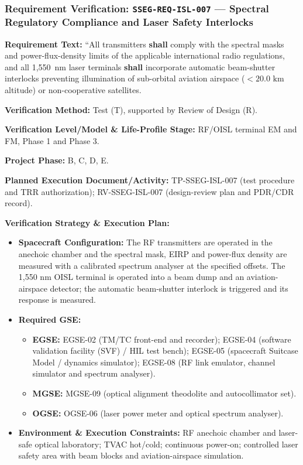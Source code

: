 \subsubsection{Requirement Verification: \texttt{SSEG-REQ-ISL-007} --- Spectral Regulatory Compliance and Laser Safety Interlocks}
\label{ver:SSEG-REQ-ISL-007}
\textbf{Requirement Text:} ``All  transmitters \textbf{shall} comply with the spectral masks and power-flux-density limits of the applicable international radio regulations, and all 1,550~nm laser  terminals \textbf{shall} incorporate automatic beam-shutter interlocks preventing illumination of sub-orbital aviation airspace ($< 20.0\text{ km}$ altitude) or non-cooperative satellites.
\par\textbf{Verification Method:} Test (T), supported by Review of Design (R).
\par\textbf{Verification Level/Model \& Life-Profile Stage:} RF/OISL terminal EM and FM, Phase 1 and Phase 3.
\par\textbf{Project Phase:} B, C, D, E.
\par\textbf{Planned Execution Document/Activity:} TP-SSEG-ISL-007 (test procedure and TRR authorization); RV-SSEG-ISL-007 (design-review plan and PDR/CDR record).
\par\textbf{Verification Strategy \& Execution Plan:}
\begin{itemize}
\item \textbf{Spacecraft Configuration:} The RF transmitters are operated in the anechoic chamber and the spectral mask, EIRP and power-flux density are measured with a calibrated spectrum analyser at the specified offsets. The 1,550 nm OISL terminal is operated into a beam dump and an aviation-airspace detector; the automatic beam-shutter interlock is triggered and its response is measured.
\item \textbf{Required GSE:}
\begin{itemize}
\item \textbf{EGSE:} EGSE-02 (TM/TC front-end and recorder); EGSE-04 (software validation facility (SVF) / HIL test bench); EGSE-05 (spacecraft Suitcase Model / dynamics simulator); EGSE-08 (RF link emulator, channel simulator and spectrum analyser).
\item \textbf{MGSE:} MGSE-09 (optical alignment theodolite and autocollimator set).
\item \textbf{OGSE:} OGSE-06 (laser power meter and optical spectrum analyser).
\end{itemize}
\item \textbf{Environment \& Execution Constraints:} RF anechoic chamber and laser-safe optical laboratory; TVAC hot/cold; continuous power-on; controlled laser safety area with beam blocks and aviation-airspace simulation.
\end{itemize}
